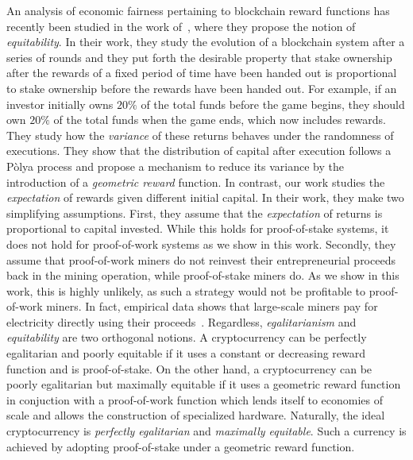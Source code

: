 An analysis of economic fairness pertaining to blockchain reward functions has recently
been studied in the work of~\cite{equitability}, where they propose the notion
of \emph{equitability}. In their work, they study the evolution of a blockchain system
after a series of rounds and they put forth the desirable property that stake ownership
after the rewards of a fixed period of time have been handed out is proportional
to stake ownership before the rewards have been handed out. For example, if an
investor initially owns $20\%$ of the total funds before the game begins, they
should own $20\%$ of the total funds when the game ends, which now includes
rewards. They study how the \emph{variance} of these returns behaves under the
randomness of executions. They show that the distribution of capital after
execution follows a Pòlya process and propose a mechanism to reduce its
variance by the introduction of a \emph{geometric reward} function.
In contrast, our work studies the \emph{expectation} of rewards given different
initial capital.
In their work, they make two simplifying assumptions.
First, they assume that the \emph{expectation} of returns is proportional to
capital invested. While this holds for proof-of-stake systems, it does not hold
for proof-of-work systems as we show in this work. Secondly, they assume that
proof-of-work miners do not reinvest their entrepreneurial proceeds back in the
mining operation, while proof-of-stake miners do. As we show in this work, this
is highly unlikely, as such a strategy would not be profitable to proof-of-work
miners. In fact, empirical data shows that large-scale miners pay for electricity
directly using their proceeds~\cite{is this even true?}. Regardless,
\emph{egalitarianism} and \emph{equitability} are two orthogonal notions. A
cryptocurrency can be perfectly egalitarian and poorly equitable if it uses a
constant or decreasing reward function and is proof-of-stake. On the other hand,
a cryptocurrency can be poorly egalitarian but maximally equitable if it uses a
geometric reward function in conjuction with a proof-of-work function which
lends itself to economies of scale and allows the construction of specialized
hardware. Naturally, the ideal cryptocurrency is \emph{perfectly egalitarian}
and \emph{maximally equitable}. Such a currency is achieved by adopting
proof-of-stake under a geometric reward function.

